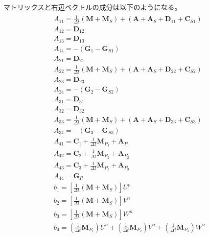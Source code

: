 マトリックスと右辺ベクトルの成分は以下のようになる。
\begin{equation}
	\begin{gathered}
		\begin{aligned} 
			&A_{11} = \frac{1}{\Delta t}\left(\bm{M}+\bm{M}_S\right)+\left(\bm{A}+\bm{A}_S+\bm{D}_{11}+\bm{C}_{S1}\right) \\ 
			&A_{12} = \bm{D}_{12} \\ 
			&A_{13} = \bm{D}_{13} \\
			&A_{14} = -\left(\bm{G}_1-\bm{G}_{S 1}\right) \\
			&A_{21} = \bm{D}_{21} \\ 
			&A_{22} = \frac{1}{\Delta t}\left(\bm{M}+\bm{M}_S\right)+\left(\bm{A}+\bm{A}_S+\bm{D}_{22}+\bm{C}_{S2}\right) \\
			&A_{23} = \bm{D}_{23} \\ 
			&A_{24} = -\left(\bm{G}_2-\bm{G}_{S 2}\right) \\
			&A_{31} = \bm{D}_{31} \\
			&A_{32} = \bm{D}_{32} \\
			&A_{33} = \frac{1}{\Delta t}\left(\bm{M}+\bm{M}_S\right)+\left(\bm{A}+\bm{A}_S+\bm{D}_{33}+\bm{C}_{S3}\right) \\
			&A_{34} = -\left(\bm{G}_3-\bm{G}_{S 3}\right) \\
			&A_{41} = \bm{C}_1+\frac{1}{\Delta t} \bm{M}_{P_1}+\bm{A}_{P_1} \\ 
			&A_{42} = \bm{C}_2+\frac{1}{\Delta t} \bm{M}_{P_2}+\bm{A}_{P_2} \\ 
			&A_{43} = \bm{C}_3+\frac{1}{\Delta t} \bm{M}_{P_3}+\bm{A}_{P_3} \\ 
			&A_{44} = \bm{G}_P \\ 
			&b_1 = \left[\frac{1}{\Delta t}\left(\bm{M}+\bm{M}_S\right)\right] U^n \\
			&b_2 = \left[\frac{1}{\Delta t}\left(\bm{M}+\bm{M}_S\right)\right] V^n \\ 
			&b_3 = \left[\frac{1}{\Delta t}\left(\bm{M}+\bm{M}_S\right)\right] W^n \\ 
			&b_4 = \left(\frac{1}{\Delta t} \bm{M}_{P_1}\right) U^n
			      +\left(\frac{1}{\Delta t} \bm{M}_{P_2}\right) V^n
			      +\left(\frac{1}{\Delta t} \bm{M}_{P_3}\right) W^n
		\end{aligned}
	\end{gathered}
\end{equation}
